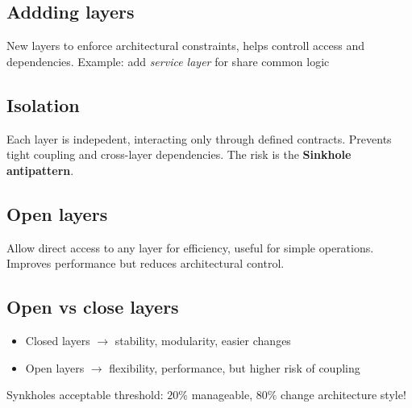 \subsection{Addding layers}
New layers to enforce architectural constraints, helps controll access and dependencies.
Example: add \textit{service layer} for share common logic

\subsection{Isolation}
Each layer is indepedent, interacting only through defined contracts.
Prevents tight coupling and cross-layer dependencies.
The risk is the \textbf{Sinkhole antipattern}.

\subsection{Open layers}
Allow direct access to any layer for efficiency, useful for simple
operations. Improves performance but reduces architectural control.


\subsection{Open vs close layers}

\begin{itemize}
  \item Closed layers $\to$ stability, modularity, easier changes
  \item Open layers $\to$ flexibility, performance, but higher risk of coupling
\end{itemize}

Synkholes acceptable threshold: $20\%$  manageable, $80\%$ change architecture style!


